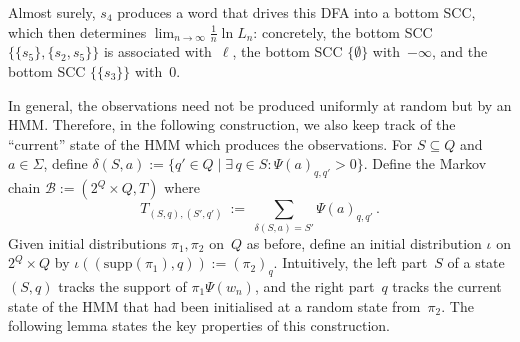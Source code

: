 \documentclass[a4paper,UKenglish,cleveref, autoref,mathscr]{lipics-v2019}
\newcommand{\1}{\mathbbm{1}}
\newcommand{\supp}{\mathrm{supp}}
\newcommand{\liexp}{\lim_{n\rightarrow\infty} \frac1n \ln L_n}
\newcommand{\B}{\mathcal{B}}
\newcommand*{\DrawBoundingBox}[1][]{%
    \draw [
        draw=gray,
    ]
    ([shift={(-1pt,-1pt)}]current bounding box.south west)
    rectangle ([shift={(1pt,1pt)}]current bounding box.north east);
}
\begin{document}
\begin{example}
\begin{center}
\end{center}
Almost surely, $s_4$ produces a word that drives this DFA into a bottom SCC, which then determines $\liexp$: concretely, the bottom SCC $\{\{s_5\},\{s_2,s_5\}\}$ is associated with~$\ell$, the bottom SCC $\{\emptyset\}$ with~$-\infty$, and the bottom SCC $\{\{s_3\}\}$ with~$0$.
\end{example}

In general, the observations need not be produced uniformly at random but by an HMM.
Therefore, in the following construction, we also keep track of the ``current'' state of the HMM which produces the observations.
For $S \subseteq Q$ and $a \in \Sigma$, define $\delta(S,a) := \{q' \in Q \mid \exists\,q \in S: \Psi(a)_{q,q'} > 0\}$.
Define the Markov chain $\B := (2^Q \times Q, T)$ where
\[
T_{(S,q),(S',q')} \ := \ \sum_{\delta(S,a) = S'} \Psi(a)_{q,q'} \,.
\]
Given initial distributions $\pi_1, \pi_2$ on~$Q$ as before, define an initial distribution $\iota$ on $2^Q \times Q$ by $\iota((\supp(\pi_1),q)) := (\pi_2)_q$.
Intuitively, the left part~$S$ of a state $(S,q)$ tracks the support of $\pi_1 \Psi(w_n)$, and the right part~$q$ tracks the current state of the HMM that had been initialised at a random state from~$\pi_2$.
The following lemma states the key properties of this construction.
\end{document}
